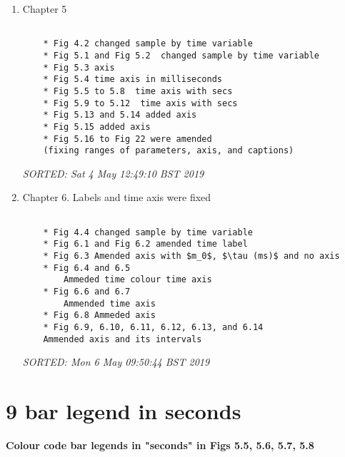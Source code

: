 \documentclass[12pt]{article}
\begin{document}
\begin{enumerate}

\item  Chapter 5 
	\begin{verbatim}

	* Fig 4.2 changed sample by time variable 
	* Fig 5.1 and Fig 5.2  changed sample by time variable 
	* Fig 5.3 axis 
	* Fig 5.4 time axis in milliseconds
	* Fig 5.5 to 5.8  time axis with secs
	* Fig 5.9 to 5.12  time axis with secs
	* Fig 5.13 and 5.14 added axis 
	* Fig 5.15 added axis
	* Fig 5.16 to Fig 22 were amended
	(fixing ranges of parameters, axis, and captions)
	\end{verbatim}
	\textit{
	SORTED:  Sat  4 May 12:49:10 BST 2019
	}
	\\
\item  Chapter 6. 
	Labels and time axis were fixed
	\begin{verbatim}

	* Fig 4.4 changed sample by time variable 
	* Fig 6.1 and Fig 6.2 amended time label
	* Fig 6.3 Amended axis with $m_0$, $\tau (ms)$ and no axis
	* Fig 6.4 and 6.5
		Ammeded time colour time axis
	* Fig 6.6 and 6.7
		Ammended time axis
	* Fig 6.8 Ammeded axis
	* Fig 6.9, 6.10, 6.11, 6.12, 6.13, and 6.14
	Ammended axis and its intervals
	\end{verbatim}
	\textit{
	SORTED: Mon  6 May 09:50:44 BST 2019
	}
	\\




\end{enumerate}




\section*{9 bar legend in seconds}
\textbf{
Colour code bar legends in "seconds"
in Figs 5.5, 5.6, 5.7, 5.8
}
\end{document}
